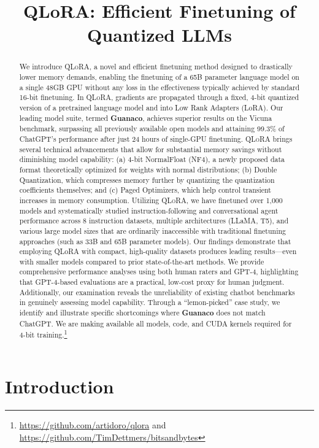 \title{QLoRA: Efficient Finetuning of Quantized LLMs}

\begin{abstract}
We introduce \textsc{QLoRA}, a novel and efficient finetuning method designed to drastically lower memory demands, enabling the finetuning of a 65B parameter language model on a single 48GB GPU without any loss in the effectiveness typically achieved by standard 16-bit finetuning. In \textsc{QLoRA}, gradients are propagated through a fixed, 4-bit quantized version of a pretrained language model and into Low Rank Adapters (LoRA). Our leading model suite, termed \textbf{Guanaco}, achieves superior results on the Vicuna benchmark, surpassing all previously available open models and attaining 99.3\% of ChatGPT’s performance after just 24 hours of single-GPU finetuning. \textsc{QLoRA} brings several technical advancements that allow for substantial memory savings without diminishing model capability: (a) 4-bit NormalFloat (NF4), a newly proposed data format theoretically optimized for weights with normal distributions; (b) Double Quantization, which compresses memory further by quantizing the quantization coefficients themselves; and (c) Paged Optimizers, which help control transient increases in memory consumption. Utilizing \textsc{QLoRA}, we have finetuned over 1,000 models and systematically studied instruction-following and conversational agent performance across 8 instruction datasets, multiple architectures (LLaMA, T5), and various large model sizes that are ordinarily inaccessible with traditional finetuning approaches (such as 33B and 65B parameter models). Our findings demonstrate that employing QLoRA with compact, high-quality datasets produces leading results—even with smaller models compared to prior state-of-the-art methods. We provide comprehensive performance analyses using both human raters and GPT-4, highlighting that GPT-4-based evaluations are a practical, low-cost proxy for human judgment. Additionally, our examination reveals the unreliability of existing chatbot benchmarks in genuinely assessing model capability. Through a “lemon-picked” case study, we identify and illustrate specific shortcomings where \textbf{Guanaco} does not match ChatGPT. We are making available all models, code, and CUDA kernels required for 4-bit training.\footnote{\url{https://github.com/artidoro/qlora} and \url{https://github.com/TimDettmers/bitsandbytes}}
\end{abstract}

\section{Introduction}

